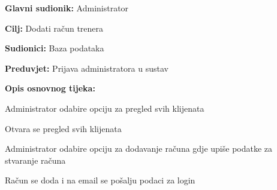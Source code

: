 				\pagebreak
								
				
				\noindent {}
				\begin{packed_item}
					
					\item \textbf{Glavni sudionik: } Administrator
					\item  \textbf{Cilj:} Dodati račun trenera
					\item  \textbf{Sudionici:} Baza podataka
					\item  \textbf{Preduvjet:}  Prijava administratora u sustav
					\item  \textbf{Opis osnovnog tijeka:}
					
					\item[] \begin{packed_enum}
						\item Administrator odabire opciju za pregled svih klijenata
						\item Otvara se pregled svih klijenata
						\item Administrator odabire opciju za dodavanje računa gdje upiše podatke za stvaranje računa
						\item Račun se doda i na email se pošalju podaci za login
					\end{packed_enum}
				\end{packed_item}
				
